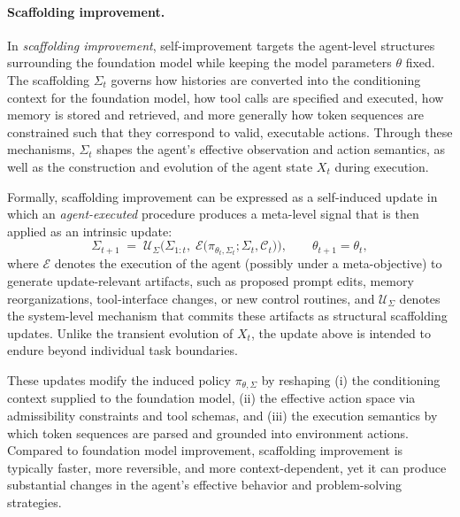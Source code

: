 \documentclass{article}
\begin{document}
\paragraph{Scaffolding improvement.}
In \emph{scaffolding improvement}, self-improvement targets the agent-level structures surrounding the foundation model while keeping the model parameters $\theta$ fixed. The scaffolding $\Sigma_t$ governs how histories are converted into the conditioning context for the foundation model, how tool calls are specified and executed, how memory is stored and retrieved, and more generally how token sequences are constrained such that they correspond to valid, executable actions. Through these mechanisms, $\Sigma_t$ shapes the agent’s effective observation and action semantics, as well as the construction and evolution of the agent state $X_t$ during execution.

Formally, scaffolding improvement can be expressed as a self-induced update in which an \emph{agent-executed} procedure produces a meta-level signal that is then applied as an intrinsic update:
\begin{equation}
\Sigma_{t+1} \;=\; \mathcal{U}_\Sigma \Big(\Sigma_{1:t},\; \mathcal{E}\big(\pi_{\theta_t,\Sigma_t}; \Sigma_t, \mathcal{C}_t\big)\Big), \qquad \theta_{t+1}=\theta_t,
\end{equation}
where $\mathcal{E}$ denotes the execution of the agent (possibly under a meta-objective) to generate update-relevant artifacts, such as proposed prompt edits, memory reorganizations, tool-interface changes, or new control routines, and $\mathcal{U}_\Sigma$ denotes the system-level mechanism that commits these artifacts as structural scaffolding updates. Unlike the transient evolution of $X_t$, the update above is intended to endure beyond individual task boundaries.

These updates modify the induced policy $\pi_{\theta,\Sigma}$ by reshaping (i) the conditioning context supplied to the foundation model, (ii) the effective action space via admissibility constraints and tool schemas, and (iii) the execution semantics by which token sequences are parsed and grounded into environment actions. Compared to foundation model improvement, scaffolding improvement is typically faster, more reversible, and more context-dependent, yet it can produce substantial changes in the agent’s effective behavior and problem-solving strategies.
\end{document}
